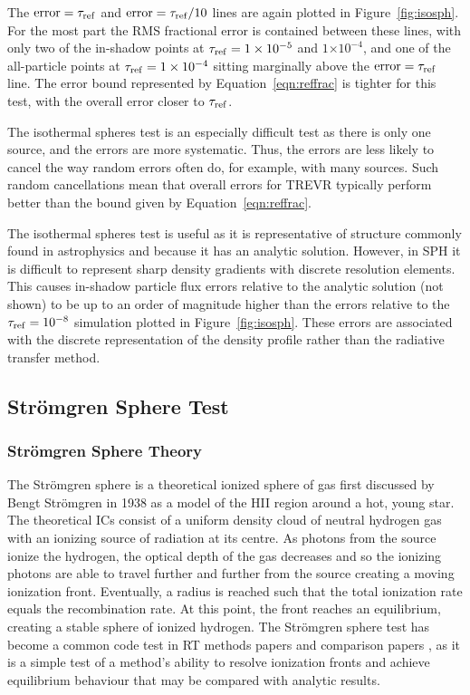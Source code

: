 \documentclass[fleq,usenatbib]{mnras}
\newcommand{\acro}{TREVR}
\providecommand{\e}[1]{\ensuremath{\times10^{#1}}}
\newcommand{\tr}{\tau_{\rm ref}}
\newcommand{\strom}{Str\"omgren}
\begin{document}
{The $\rm{error}=\tr$ and $\rm{error}=\tr/10$ lines are again plotted in 
Figure~\ref{fig:isosph}. For the most part the RMS fractional error is 
contained between these lines, with only two of the in-shadow points at 
$\tr=1\e{-5}$ and $1\e{-4}$,  and one of the all-particle points at  
$\tr=1\e{-4}$ sitting marginally above the $\rm{error}=\tr$ line. The error 
bound represented by Equation~\ref{eqn:reffrac} is tighter for this test, with 
the overall error closer to $\tr$.

The isothermal spheres test is an especially difficult test as there is only 
one source, and the errors are more systematic. Thus, the errors are less 
likely to cancel the way random errors often do, for example, with many sources. 
Such random cancellations mean that overall errors for \acro{}
typically perform better than the bound given by Equation~\ref{eqn:reffrac}.

The isothermal spheres test is useful as it is representative of structure
commonly found in astrophysics and because it has an analytic solution. 
However, in SPH it is difficult to represent sharp density gradients with 
discrete resolution elements. This causes in-shadow particle flux errors 
relative to the analytic solution (not shown) to be up to an order of magnitude higher 
than the errors relative to the $\tr = 10^{-8}$ simulation plotted in 
Figure~\ref{fig:isosph}. These errors are associated with the discrete 
representation of the density profile rather than the radiative transfer 
method.

\subsection{\strom{} Sphere Test} \label{stromgren}
\subsubsection{\strom{} Sphere Theory}
The \strom{} sphere is a theoretical ionized sphere of gas first discussed by 
Bengt \strom{} in 1938 \citep{stromgren39} as a model of the HII region around 
a hot, young star. The theoretical ICs consist of a uniform 
density cloud of neutral hydrogen gas with an ionizing source of radiation at 
its centre. As photons from the source ionize the hydrogen, the optical depth 
of the gas decreases and so the ionizing photons are able to travel further 
and further from the source creating a moving ionization front.  Eventually,
a radius is reached such that the total ionization rate equals the 
recombination rate.  At this point, the front reaches an equilibrium, creating 
a stable sphere of ionized hydrogen. The \strom{} sphere test has become a 
common code test in RT methods papers \citep{pawlikSchaye08, pawlikSchaye11, 
petkovaSpringel11} and comparison papers \citep{ilievEt06, ilievEt09}, as it 
is a simple test of a method's ability to resolve ionization fronts and 
achieve equilibrium behaviour that may be compared with analytic results.

}
\end{document}
